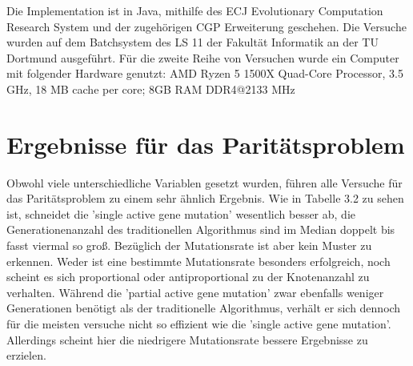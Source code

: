 Die Implementation ist in Java, mithilfe des ECJ Evolutionary Computation Research System und der zugehörigen CGP Erweiterung geschehen. Die Versuche wurden auf dem Batchsystem des LS 11 der Fakultät Informatik an der TU Dortmund ausgeführt. Für die zweite Reihe von Versuchen wurde ein Computer mit folgender Hardware genutzt:  AMD Ryzen 5 1500X Quad-Core Processor, 3.5 GHz, 18 MB cache per core; 8GB RAM DDR4@2133 MHz


\section{Ergebnisse für das Paritätsproblem}

Obwohl viele unterschiedliche Variablen gesetzt wurden, führen alle Versuche für das Paritätsproblem zu einem sehr ähnlich Ergebnis. Wie in Tabelle 3.2 zu sehen ist, schneidet die 'single active gene mutation' wesentlich besser ab, die Generationenanzahl des traditionellen Algorithmus sind im Median doppelt bis fasst viermal so groß. Bezüglich der Mutationsrate ist aber kein Muster zu erkennen. Weder ist eine bestimmte Mutationsrate besonders erfolgreich, noch scheint es sich proportional oder antiproportional zu der Knotenanzahl zu verhalten. Während die 'partial active gene mutation' zwar ebenfalls weniger Generationen benötigt als der traditionelle Algorithmus, verhält er sich dennoch für die meisten versuche nicht so effizient wie die 'single active gene mutation'. Allerdings scheint hier die niedrigere Mutationsrate bessere Ergebnisse zu erzielen.




